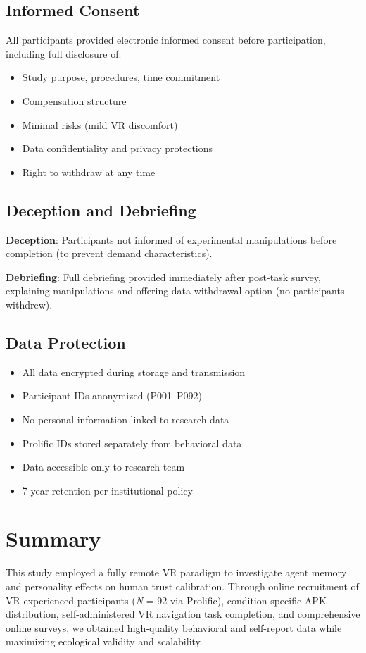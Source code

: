 \documentclass[12pt]{article}
\begin{document}
\subsection{Informed Consent}

All participants provided electronic informed consent before participation, including full disclosure of:
\begin{itemize}
    \item Study purpose, procedures, time commitment
    \item Compensation structure
    \item Minimal risks (mild VR discomfort)
    \item Data confidentiality and privacy protections
    \item Right to withdraw at any time
\end{itemize}

\subsection{Deception and Debriefing}

\textbf{Deception}: Participants not informed of experimental manipulations before completion (to prevent demand characteristics).

\textbf{Debriefing}: Full debriefing provided immediately after post-task survey, explaining manipulations and offering data withdrawal option (no participants withdrew).

\subsection{Data Protection}

\begin{itemize}
    \item All data encrypted during storage and transmission
    \item Participant IDs anonymized (P001--P092)
    \item No personal information linked to research data
    \item Prolific IDs stored separately from behavioral data
    \item Data accessible only to research team
    \item 7-year retention per institutional policy
\end{itemize}

\section{Summary}

This study employed a fully remote VR paradigm to investigate agent memory and personality effects on human trust calibration. Through online recruitment of VR-experienced participants (\textit{N} = 92 via Prolific), condition-specific APK distribution, self-administered VR navigation task completion, and comprehensive online surveys, we obtained high-quality behavioral and self-report data while maximizing ecological validity and scalability.



\end{document}
